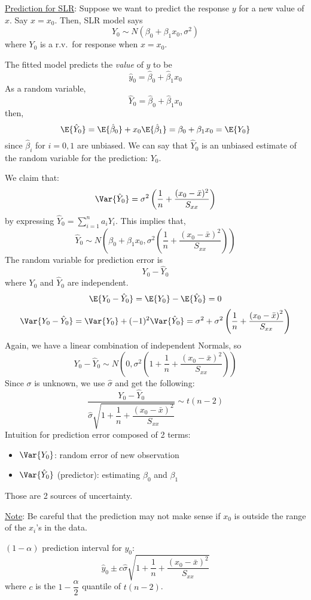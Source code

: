 \underline{Prediction for SLR}: Suppose
we want to predict the response $ y $
for a new value of $ x $. Say $ x=x_0 $. Then,
SLR model says
\[ Y_0 \sim N(\beta_0+\beta_1 x_0,\sigma^2) \]
where $ Y_0 $ is a r.v.\ for response when $ x=x_0 $.

The fitted model predicts the \emph{value} of $ y $
to be
\[ \hat{y}_0=\hat{\beta}_0+\hat{\beta}_1x_0 \]
As a random variable,
\[ \hat{Y}_0=\hat{\beta}_0+\hat{\beta}_1x_0 \]
then,
\[ \E{\hat{Y}_0}=\E{\hat{\beta}_0}+x_0\E{\hat{\beta}_1}=
    \beta_0+\beta_1x_0=\E{Y_0} \]
since $ \hat{\beta}_i $ for $ i=0,1 $ are unbiased.
We can say that $ \hat{Y}_0 $ is an unbiased estimate
of the random variable for the prediction: $ Y_0 $.

We claim that:
\[  \Var{\hat{Y}_0}=\sigma^2\left( \frac{1}{n} +\frac{(x_0-\bar{x})^2}{S_{xx}}  \right) \]
by expressing $ \hat{Y}_0=\sum\limits_{i=1}^{n} a_i Y_i $. This implies
that,
\[ \hat{Y}_0 \sim N\left( \beta_0+\beta_1x_0,
    \sigma^2\left( \frac{1}{n} +\frac{\left( x_0-\bar{x} \right)^2}{S_{xx}}  \right) \right) \]
The random variable for prediction error is
\[ Y_0-\hat{Y}_0 \]
where $ Y_0 $ and $ \hat{Y}_0 $ are independent.
\[ \E{Y_0-\hat{Y}_0}=\E{Y_0}-\E{\hat{Y}_0}=0 \]
\[ \Var{Y_0-\hat{Y}_0}=\Var{Y_0}+(-1)^2\Var{\hat{Y}_0}
    =\sigma^2+\sigma^2\left( \frac{1}{n} +\frac{\left( x_0-\bar{x} \right)^2}{S_{xx}} \right)
\]
Again, we have a linear combination of independent Normals, so
\[ Y_0-\hat{Y}_0
    \sim N\left( 0,\sigma^2\left( 1+\frac{1}{n}+\frac{\left( x_0-\bar{x} \right)^2}{S_{xx}}  \right) \right) \]
Since $ \sigma $ is unknown, we use $ \hat{\sigma} $ and get the following:
\[ \frac{Y_0-\hat{Y}_0}{
        \hat{\sigma}\sqrt{1+\dfrac{1}{n}+\dfrac{(x_0-\bar{x})^2}{S_{xx}}}
    } \sim t(n-2) \]
Intuition for prediction error composed of 2 terms:
\begin{itemize}
    \item $ \Var{Y_0} $: random error of new observation
    \item $ \Var{\hat{Y}_0} $ (predictor): estimating $ \beta_0 $ and $ \beta_1 $
\end{itemize}
Those are 2 sources of uncertainty.

\underline{Note}: Be careful that the prediction may not make sense if
$ x_0 $ is outside the range of the $ x_i $'s in the data.

$ (1-\alpha) $ prediction interval for $ y_0 $:
\[ \hat{y}_0\pm c \hat{\sigma}\sqrt{1+\dfrac{1}{n}+\dfrac{(x_0-\bar{x})^2}{S_{xx}}}
\]
where $ c $ is the $ 1-\dfrac{\alpha}{2} $ quantile of $ t(n-2) $.

